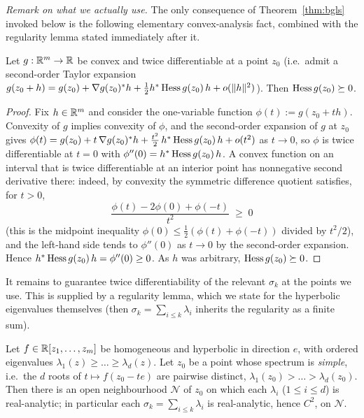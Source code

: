 \noindent\emph{Remark on what we actually use.} The only consequence of
Theorem~\ref{thm:bgls} invoked below is the following elementary
convex-analysis fact, combined with the regularity lemma stated immediately
after it.

\begin{qfourlemma}\label{lem:convC2}
Let $g:\mathbb{R}^m\to\mathbb{R}$ be convex and twice differentiable at a point $z_0$
(i.e.\ admit a second-order Taylor expansion
$g(z_0+h)=g(z_0)+\nabla g(z_0)^\ast h+\tfrac12 h^\ast\operatorname{Hess} g(z_0)\,h+o(\|h\|^2)$).
Then $\operatorname{Hess} g(z_0)\succeq 0$.
\end{qfourlemma}

\begin{proof}
Fix $h\in\mathbb{R}^m$ and consider the one-variable function
$\phi(t):=g(z_0+th)$. Convexity of $g$ implies convexity of $\phi$, and the
second-order expansion of $g$ at $z_0$ gives
$\phi(t)=g(z_0)+t\,\nabla g(z_0)^\ast h+\tfrac{t^2}{2}\,h^\ast\operatorname{Hess} g(z_0)\,h+o(t^2)$
as $t\to0$, so $\phi$ is twice differentiable at $t=0$ with
$\phi''(0)=h^\ast\operatorname{Hess} g(z_0)\,h$. A convex function on an interval that is
twice differentiable at an interior point has nonnegative second derivative
there: indeed, by convexity the symmetric difference quotient satisfies, for
$t>0$,
\[
\frac{\phi(t)-2\phi(0)+\phi(-t)}{t^2}\;\ge\;0
\]
(this is the midpoint inequality $\phi(0)\le\tfrac12(\phi(t)+\phi(-t))$ divided by
$t^2/2$), and the left-hand side tends to $\phi''(0)$ as $t\to0$ by the
second-order expansion. Hence $h^\ast\operatorname{Hess} g(z_0)\,h=\phi''(0)\ge0$. As
$h$ was arbitrary, $\operatorname{Hess} g(z_0)\succeq 0$.
\end{proof}

It remains to guarantee twice differentiability of the relevant
$\sigma_k$ at the points we use. This is supplied by a regularity lemma, which we
state for the hyperbolic eigenvalues themselves (then $\sigma_k=\sum_{i\le
k}\lambda_i$ inherits the regularity as a finite sum).

\begin{qfourlemma}\label{lem:reg}
Let $f\in\mathbb{R}[z_1,\dots,z_m]$ be homogeneous and hyperbolic in direction $e$,
with ordered eigenvalues $\lambda_1(z)\ge\dots\ge\lambda_d(z)$. Let $z_0$ be a
point whose spectrum is \emph{simple}, i.e.\ the $d$ roots of
$t\mapsto f(z_0-te)$ are pairwise distinct,
$\lambda_1(z_0)>\dots>\lambda_d(z_0)$. Then there is an open neighbourhood
$\mathcal N$ of $z_0$ on which each $\lambda_i$ ($1\le i\le d$) is real-analytic;
in particular each $\sigma_k=\sum_{i\le k}\lambda_i$ is real-analytic, hence
$C^2$, on $\mathcal N$.
\end{qfourlemma}

